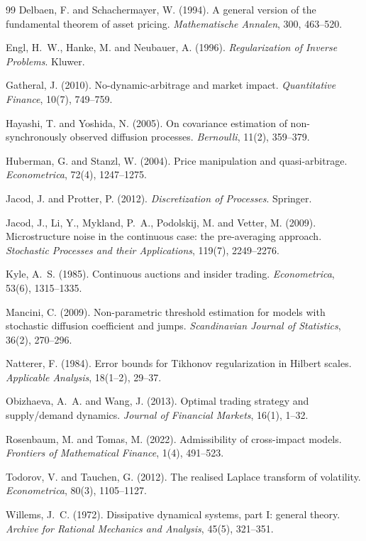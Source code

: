 \documentclass[11pt]{article}
\begin{document}
\begin{thebibliography}{99}
Delbaen, F. and Schachermayer, W. (1994).
\newblock A general version of the fundamental theorem of asset pricing.
\newblock \emph{Mathematische Annalen}, 300, 463--520.

Engl, H.~W., Hanke, M. and Neubauer, A. (1996).
\newblock \emph{Regularization of Inverse Problems}.
\newblock Kluwer.

Gatheral, J. (2010).
\newblock No-dynamic-arbitrage and market impact.
\newblock \emph{Quantitative Finance}, 10(7), 749--759.

Hayashi, T. and Yoshida, N. (2005).
\newblock On covariance estimation of non-synchronously observed diffusion processes.
\newblock \emph{Bernoulli}, 11(2), 359--379.

Huberman, G. and Stanzl, W. (2004).
\newblock Price manipulation and quasi-arbitrage.
\newblock \emph{Econometrica}, 72(4), 1247--1275.

Jacod, J. and Protter, P. (2012).
\newblock \emph{Discretization of Processes}.
\newblock Springer.

Jacod, J., Li, Y., Mykland, P.~A., Podolskij, M. and Vetter, M. (2009).
\newblock Microstructure noise in the continuous case: the pre-averaging approach.
\newblock \emph{Stochastic Processes and their Applications}, 119(7), 2249--2276.

Kyle, A.~S. (1985).
\newblock Continuous auctions and insider trading.
\newblock \emph{Econometrica}, 53(6), 1315--1335.

Mancini, C. (2009).
\newblock Non-parametric threshold estimation for models with stochastic diffusion coefficient and jumps.
\newblock \emph{Scandinavian Journal of Statistics}, 36(2), 270--296.

Natterer, F. (1984).
\newblock Error bounds for Tikhonov regularization in Hilbert scales.
\newblock \emph{Applicable Analysis}, 18(1--2), 29--37.

Obizhaeva, A.~A. and Wang, J. (2013).
\newblock Optimal trading strategy and supply/demand dynamics.
\newblock \emph{Journal of Financial Markets}, 16(1), 1--32.

Rosenbaum, M. and Tomas, M. (2022).
\newblock Admissibility of cross-impact models.
\newblock \emph{Frontiers of Mathematical Finance}, 1(4), 491--523.

Todorov, V. and Tauchen, G. (2012).
\newblock The realised Laplace transform of volatility.
\newblock \emph{Econometrica}, 80(3), 1105--1127.

Willems, J.~C. (1972).
\newblock Dissipative dynamical systems, part I: general theory.
\newblock \emph{Archive for Rational Mechanics and Analysis}, 45(5), 321--351.

\end{thebibliography}
\end{document}
